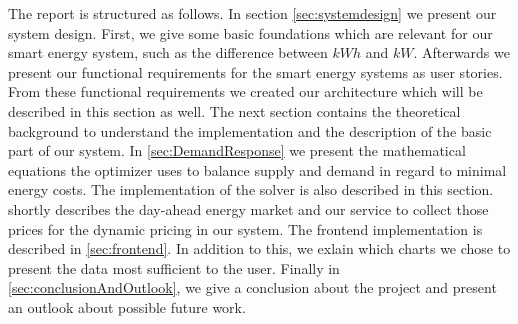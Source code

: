The report is structured as follows.
In section \ref{sec:systemdesign} we present our system design.
First, we give some basic foundations which are relevant for our smart energy system, such as the difference between $kWh$ and $kW$.
Afterwards we present our functional requirements for the smart energy systems as user stories.
From these functional requirements we created our architecture which will be described in this section as well. The next section contains the theoretical background to understand the implementation and the description of the basic part of our system. 
In \cref{sec:DemandResponse} we present the mathematical equations the optimizer uses to balance supply and demand in regard to minimal energy costs.
The implementation of the solver is also described in this section.
 shortly describes the day-ahead energy market and our service to collect those prices for the dynamic pricing in our system.
The frontend implementation is described in \cref{sec:frontend}.
In addition to this, we exlain which charts we chose to present the data most sufficient to the user.
Finally in \cref{sec:conclusionAndOutlook}, we give a conclusion about the project and present an outlook about possible future work. 